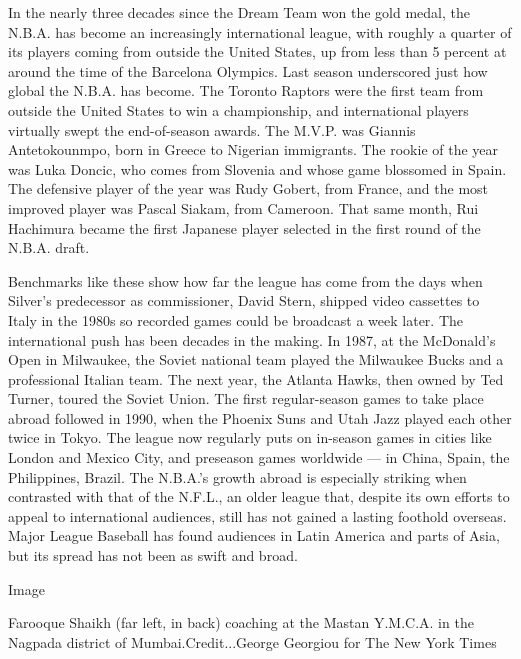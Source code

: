 In the nearly three decades since the Dream Team won the gold medal, the
N.B.A. has become an increasingly international league, with roughly a
quarter of its players coming from outside the United States, up from
less than 5 percent at around the time of the Barcelona Olympics. Last
season underscored just how global the N.B.A. has become. The Toronto
Raptors were the first team from outside the United States to win a
championship, and international players virtually swept the
end-of-season awards. The M.V.P. was Giannis Antetokounmpo, born in
Greece to Nigerian immigrants. The rookie of the year was Luka Doncic,
who comes from Slovenia and whose game blossomed in Spain. The defensive
player of the year was Rudy Gobert, from France, and the most improved
player was Pascal Siakam, from Cameroon. That same month, Rui Hachimura
became the first Japanese player selected in the first round of the
N.B.A. draft.

Benchmarks like these show how far the league has come from the days
when Silver's predecessor as commissioner, David Stern, shipped video
cassettes to Italy in the 1980s so recorded games could be broadcast a
week later. The international push has been decades in the making. In
1987, at the McDonald's Open in Milwaukee, the Soviet national team
played the Milwaukee Bucks and a professional Italian team. The next
year, the Atlanta Hawks, then owned by Ted Turner, toured the Soviet
Union. The first regular-season games to take place abroad followed in
1990, when the Phoenix Suns and Utah Jazz played each other twice in
Tokyo. The league now regularly puts on in-season games in cities like
London and Mexico City, and preseason games worldwide --- in China,
Spain, the Philippines, Brazil. The N.B.A.'s growth abroad is especially
striking when contrasted with that of the N.F.L., an older league that,
despite its own efforts to appeal to international audiences, still has
not gained a lasting foothold overseas. Major League Baseball has found
audiences in Latin America and parts of Asia, but its spread has not
been as swift and broad.

Image

Farooque Shaikh (far left, in back) coaching at the Mastan Y.M.C.A. in
the Nagpada district of Mumbai.Credit...George Georgiou for The New York
Times

